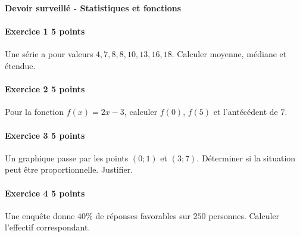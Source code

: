 \documentclass[a4paper,10pt]{article}
\newenvironment{exercice}[2]{\paragraph{Exercice #1 \hfill #2 points}\mbox{}\par}{\medskip}
\begin{document}
\begin{center}\Large\bfseries Devoir surveillé - Statistiques et fonctions\end{center}
\vspace{2mm}
\begin{exercice}{1}{5}Une série a pour valeurs $4,7,8,8,10,13,16,18$. Calculer moyenne, médiane et étendue.\end{exercice}\begin{exercice}{2}{5}Pour la fonction $f(x)=2x-3$, calculer $f(0)$, $f(5)$ et l'antécédent de $7$.\end{exercice}\begin{exercice}{3}{5}Un graphique passe par les points $(0;1)$ et $(3;7)$. Déterminer si la situation peut être proportionnelle. Justifier.\end{exercice}\begin{exercice}{4}{5}Une enquête donne $40\%$ de réponses favorables sur $250$ personnes. Calculer l'effectif correspondant.\end{exercice}\end{document}
\end{document}

